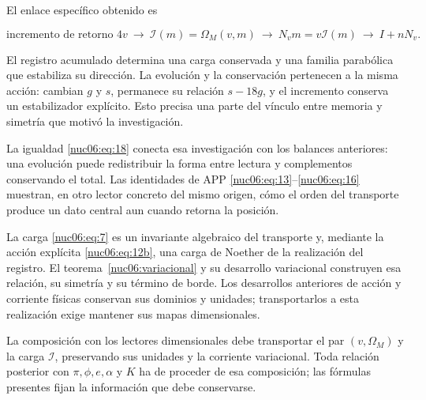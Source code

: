 El enlace específico obtenido es

\begin{equation}
\text{incremento de retorno }4v
\ \longrightarrow\ \mathcal I(m)=\Omega_M(v,m)
\ \longrightarrow\ N_vm=v\mathcal I(m)
\ \longrightarrow\ I+nN_v.
\label{nuc06:eq:21}
\end{equation}

El registro acumulado determina una carga conservada y una familia parabólica que estabiliza su dirección. La evolución y la conservación pertenecen a la misma acción: cambian \(g\) y \(s\), permanece su relación \(s-18g\), y el incremento conserva un estabilizador explícito. Esto precisa una parte del vínculo entre memoria y simetría que motivó la investigación.

La igualdad \eqref{nuc06:eq:18} conecta esa investigación con los balances anteriores: una evolución puede redistribuir la forma entre lectura y complementos conservando el total. Las identidades de APP \eqref{nuc06:eq:13}–\eqref{nuc06:eq:16} muestran, en otro lector concreto del mismo origen, cómo el orden del transporte produce un dato central aun cuando retorna la posición.

La carga \eqref{nuc06:eq:7} es un invariante algebraico del transporte y, mediante la acción explícita \eqref{nuc06:eq:12b}, una carga de Noether de la realización del registro. El teorema~\ref{nuc06:variacional} y su desarrollo variacional construyen esa relación, su simetría y su término de borde. Los desarrollos anteriores de acción y corriente físicas conservan sus dominios y unidades; transportarlos a esta realización exige mantener sus mapas dimensionales.

La composición con los lectores dimensionales debe transportar el par \((v,\Omega_M)\) y la carga \(\mathcal I\), preservando sus unidades y la corriente variacional. Toda relación posterior con \(\pi,\phi,e,\alpha\) y \(K\) ha de proceder de esa composición; las fórmulas presentes fijan la información que debe conservarse.
